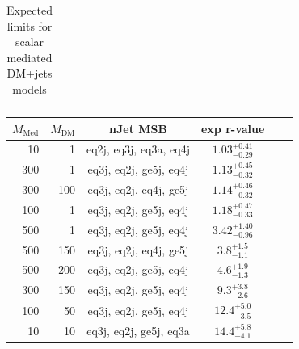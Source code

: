 \begin{table}
\begin{tabular}{rrcccc}
    \hline\hline
  \end{tabular}
  \caption{Expected limits for scalar mediated DM+jets models}
  \label{tab:DMS_exp}
\end{table}

\begin{table}
  \centering
  \begin{tabular}{rrcccc}
    \hline\hline
    $M_{\text{Med}}$ & $M_{\text{DM}}$ & nJet MSB & exp r-value\\
    \hline
       10 &   1 & eq2j, eq3j, eq3a, eq4j & $1.03_{-0.29}^{+0.41}$ \\ %
      300 &   1 & eq3j, eq2j, ge5j, eq4j & $1.13_{-0.32}^{+0.45}$ \\ %
      300 & 100 & eq3j, eq2j, eq4j, ge5j & $1.14_{-0.32}^{+0.46}$ \\ %
      100 &   1 & eq3j, eq2j, ge5j, eq4j & $1.18_{-0.33}^{+0.47}$ \\ %
      500 &   1 & eq3j, eq2j, ge5j, eq4j & $3.42_{-0.96}^{+1.40}$ \\ %
      500 & 150 & eq3j, eq2j, eq4j, ge5j & $3.8_{-1.1}^{+1.5}$    \\ %
      500 & 200 & eq3j, eq2j, ge5j, eq4j & $4.6_{-1.3}^{+1.9}$    \\ %
      300 & 150 & eq3j, eq2j, ge5j, eq4j & $9.3_{-2.6}^{+3.8}$    \\ %
      100 &  50 & eq3j, eq2j, ge5j, eq4j & $12.4_{-3.5}^{+5.0}$   \\ %
       10 &  10 & eq3j, eq2j, ge5j, eq3a & $14.4_{-4.1}^{+5.8}$   \\ %

\end{tabular}
\end{table}
